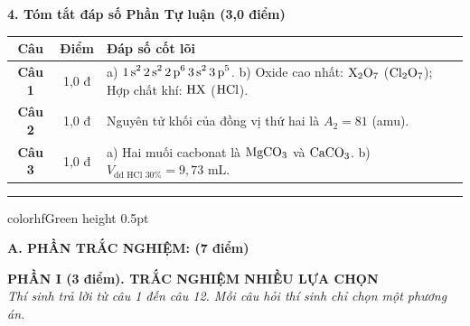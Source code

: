 \documentclass[11pt,a4paper]{article}
\begin{document}
\vspace{2pt}
\noindent
\textbf{\color{mainGreen}4. Tóm tắt đáp số Phần Tự luận (3,0 điểm)}
\begin{center}
\renewcommand{\arraystretch}{1.2}
\begin{tabular}{|c|c|p{11.5cm}|}
\hline
\rowcolor{tableGreen}
\textbf{Câu} & \textbf{Điểm} & \textbf{Đáp số cốt lõi} \\
\hline
\textbf{Câu 1} & 1,0 đ & a) $\ce{1s^2 2s^2 2p^6 3s^2 3p^5}$. \quad b) Oxide cao nhất: $\ce{X2O7}$ ($\ce{Cl2O7}$); Hợp chất khí: $\ce{HX}$ ($\ce{HCl}$). \\
\hline
\textbf{Câu 2} & 1,0 đ & Nguyên tử khối của đồng vị thứ hai là $A_2 = 81$ (amu). \\
\hline
\textbf{Câu 3} & 1,0 đ & a) Hai muối cacbonat là $\ce{MgCO3}$ và $\ce{CaCO3}$. \quad b) $V_{\text{dd HCl 30\%}} = 9,73\text{ mL}$. \\
\hline
\end{tabular}
\end{center}

\vspace{4pt}
\hrule color{hfGreen} height 0.5pt

\vspace{4pt}
\noindent
{\color{mainGreen}\textbf{\Large A. PHẦN TRẮC NGHIỆM: (7 điểm)}}

\vspace{3pt}
\noindent
{\color{mainGreen}\textbf{\large PHẦN I (3 điểm). TRẮC NGHIỆM NHIỀU LỰA CHỌN}}\\
\textit{\small Thí sinh trả lời từ câu 1 đến câu 12. Mỗi câu hỏi thí sinh chỉ chọn một phương án.}
\vspace{2pt}
\end{document}
